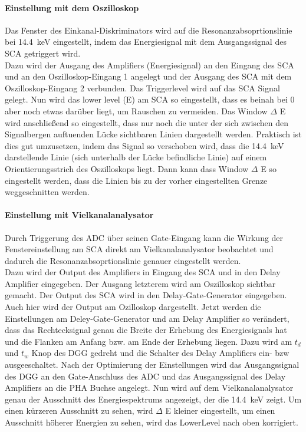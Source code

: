 \documentclass[a4paper,twoside,final]{article}
\begin{document}
\paragraph{Einstellung mit dem Oszilloskop}
Das Fenster des Einkanal-Diskriminators wird auf die Resonanzabsoprtionslinie bei \SI{14,4}{\kilo\eV} eingestellt, indem das Energiesignal mit dem Ausgangssignal des SCA getriggert wird. \\
Dazu wird der Ausgang des Amplifiers (Energiesignal) an den Eingang des SCA
und an den Oszilloskop-Eingang 1 angelegt und der Ausgang des SCA mit dem Oszilloskop-Eingang 2 verbunden. Das Triggerlevel wird auf das SCA Signal gelegt. Nun wird das lower level (E) am SCA so eingestellt, dass es beinah bei 0 aber noch etwas darüber liegt, um Rauschen zu vermeiden. Das Window $\Delta$ E wird anschließend so eingestellt, dass nur noch die unter der sich zwischen den Signalbergen auftuenden Lücke sichtbaren Linien dargestellt werden. Praktisch ist dies gut umzusetzen, indem das Signal so verschoben wird, dass die \SI{14,4}{\kilo\eV} darstellende Linie (sich unterhalb der Lücke befindliche Linie) auf einem Orientierungsstrich des Oszilloskops liegt. Dann kann dass Window $\Delta$ E so eingestellt werden, dass die Linien bis zu der vorher eingestellten Grenze weggeschnitten werden.

\paragraph{Einstellung mit Vielkanalanalysator}
Durch Triggerung des  ADC über seinen Gate-Eingang kann die Wirkung der Fenstereinstellung am SCA direkt am Vielkanalanalysator beobachtet und dadurch die Resonanzabsoprtionslinie genauer eingestellt werden. \\
Dazu wird der Output des Amplifiers in Eingang des SCA und in den Delay Amplifier eingegeben. Der Ausgang letzterem wird am Oszilloskop sichtbar gemacht. Der Output des SCA wird in den Delay-Gate-Generator eingegeben.
Auch hier wird der Output am Ozilloskop dargestellt. Jetzt werden die Einstellungen am Deley-Gate-Generator und am Delay Amplifier so verändert, dass das Rechtecksignal genau die Breite der Erhebung des Energiesignals hat und die Flanken am Anfang bzw. am Ende der Erhebung liegen. Dazu wird am $t_d$ und $t_w$ Knop des DGG gedreht und die Schalter des Delay Amplifiers ein- bzw ausgeeschaltet. Nach der Optimierung der Einstellungen wird das Ausgangssignal des DGG an den Gate-Anschluss des ADC und das Ausgangssignal des Delay Amplifiers an die PHA Buchse angelegt. Nun wird auf dem Vielkanalanalysator genau der Ausschnitt des Energiespektrums angezeigt, der die \SI{14,4}{\kilo\eV} zeigt. Um einen kürzeren Ausschnitt zu sehen, wird $\Delta$ E kleiner eingestellt, um einen Ausschnitt höherer Energien zu sehen, wird das LowerLevel nach oben korrigiert. \\
\end{document}
